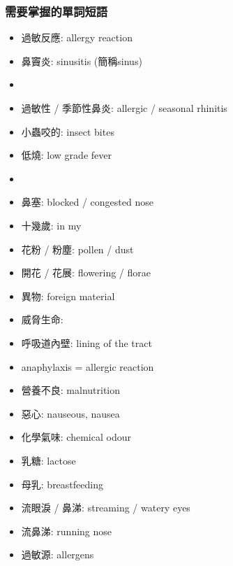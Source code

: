 \subsubsection*{需要掌握的單詞短語}
\begin{multicols}{2}
\begin{itemize}
  \itemsep0em
  \item 過敏反應: allergy reaction
  \item 鼻竇炎: sinusitis (簡稱sinus)
  \item {}
  \item 過敏性 / 季節性鼻炎: allergic / seasonal rhinitis
  \item 小蟲咬的: insect bites
  \item 低燒: low grade fever
  \item {}
  \item 鼻塞: blocked / congested nose
  \item 十幾歲: in my 
  \item 花粉 / 粉塵: pollen / dust
  \item 開花 / 花展: flowering / florae
  \item 異物: foreign material
  \item 威脅生命: 
  \item 呼吸道內壁: lining of the tract
  \item anaphylaxis = allergic reaction
  \item 營養不良: malnutrition
  \item 惡心: nauseous, nausea
  \item 化學氣味: chemical odour
  \item 乳糖: lactose
  \item 母乳: breastfeeding
  \item 流眼淚 / 鼻涕: streaming / watery eyes
  \item 流鼻涕: running nose
  \item 過敏源: allergens
\end{itemize}
\end{multicols}

